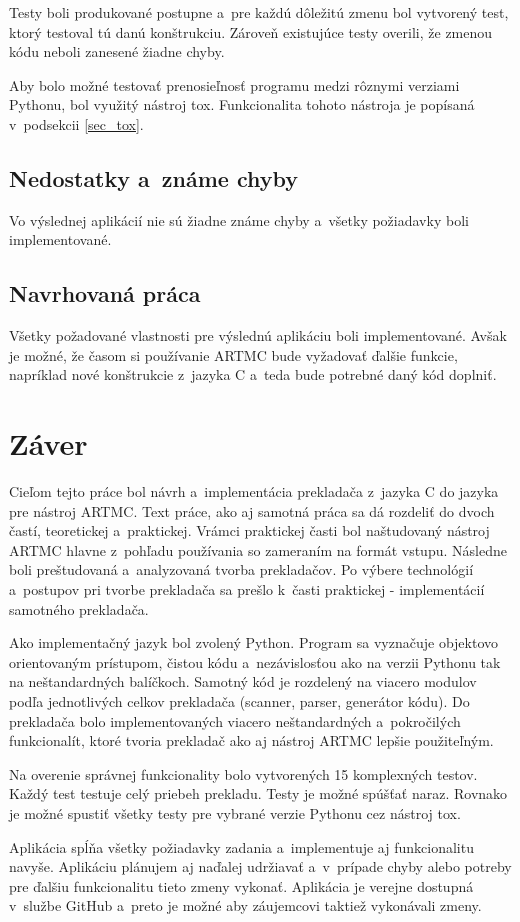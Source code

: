 Testy boli produkované postupne a~pre každú dôležitú zmenu bol vytvorený test, ktorý testoval tú danú konštrukciu. Zároveň existujúce testy overili, že zmenou kódu neboli zanesené žiadne chyby.

Aby bolo možné testovať prenosieľnosť programu medzi rôznymi verziami Pythonu, bol využitý nástroj tox. Funkcionalita tohoto nástroja je popísaná v~podsekcii \ref{sec_tox}.

\section{Nedostatky a~známe chyby}
Vo výslednej aplikácií nie sú žiadne známe chyby a~všetky požiadavky boli implementované.

\section{Navrhovaná práca}
Všetky požadované vlastnosti pre výslednú aplikáciu boli implementované. Avšak je možné, že časom si používanie ARTMC bude vyžadovať ďalšie funkcie, napríklad nové konštrukcie z~jazyka C a~teda bude potrebné daný kód doplniť. 

\chapter{Záver}
Cieľom tejto práce bol návrh a~implementácia prekladača z~jazyka C do jazyka pre nástroj ARTMC. Text práce, ako aj samotná práca sa dá rozdeliť do dvoch častí, teoretickej a~praktickej. Vrámci praktickej časti bol naštudovaný nástroj ARTMC hlavne  z~pohľadu používania so zameraním na formát vstupu. Následne boli preštudovaná a~analyzovaná tvorba prekladačov. Po výbere technológií a~postupov pri tvorbe prekladača sa prešlo k~časti praktickej - implementácií samotného prekladača.

Ako implementačný jazyk bol zvolený Python. Program sa vyznačuje objektovo orientovaným prístupom, čistou kódu a~nezávislosťou ako na verzii Pythonu tak na neštandardných balíčkoch. Samotný kód je rozdelený na viacero modulov podľa jednotlivých celkov prekladača (scanner, parser, generátor kódu). Do prekladača bolo implementovaných viacero neštandardných a~pokročilých funkcionalít, ktoré tvoria prekladač ako aj nástroj ARTMC lepšie použiteľným.

Na overenie správnej funkcionality bolo vytvorených 15 komplexných testov. Každý test testuje celý priebeh prekladu. Testy je možné spúšťať naraz. Rovnako je možné spustiť všetky testy pre vybrané verzie Pythonu cez nástroj tox.

Aplikácia spĺňa všetky požiadavky zadania a~implementuje aj funkcionalitu navyše. Aplikáciu plánujem aj naďalej udržiavať a~v~prípade chyby alebo potreby pre ďalšiu funkcionalitu tieto zmeny vykonať. Aplikácia je verejne dostupná v~službe GitHub a~preto je možné aby záujemcovi taktiež vykonávali zmeny.


